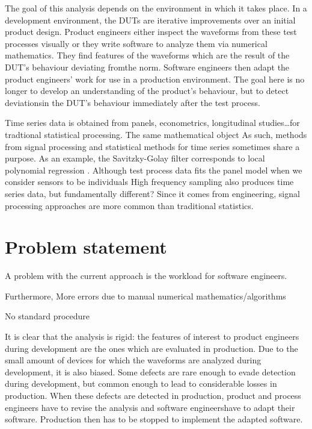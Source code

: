 The goal of this analysis depends on the environment in which it takes place.
In a development environment, the DUTs are iterative improvements over an initial product design.
Product engineers either inspect the waveforms from these test processes visually or they write software to analyze them via numerical mathematics. They find features of the waveforms which are the result of the DUT’s behaviour deviating fromthe norm. Software engineers then adapt the product engineers’ work for use in a production environment.
The goal here is no longer to develop an understanding of the product’s behaviour, but to detect deviationsin the DUT’s behaviour immediately after the test process.

Time series data is  obtained from panels, econometrics, longitudinal studies\ldots for tradtional statistical processing.
The same mathematical object
As such, methods from signal processing and statistical methods for time series sometimes share a purpose.
As an example, the Savitzky-Golay filter \citep{savitzky1964smoothing} corresponds to local polynomial regression \citep{cleveland1979robust}.
Although test process data fits the panel model when we consider sensors to be individuals
High frequency sampling also produces time series data, but fundamentally different? Since it comes from engineering, signal processing approaches are more common than traditional statistics.

\section{Problem statement}

A problem with the current approach is the workload for software engineers.

Furthermore, More errors due to manual numerical mathematics/algorithms

No standard procedure

It is clear that the analysis is rigid: the features of interest to product engineers during development are the ones which are evaluated in production.
Due to the small amount of devices for which the waveforms are analyzed during development, it is also biased.
Some defects are rare enough to evade detection during development, but common enough to lead to considerable losses in production.
When these defects are detected in production, product and process engineers have to revise the analysis and software engineershave to adapt their software.
Production then has to be stopped to implement the adapted software.

